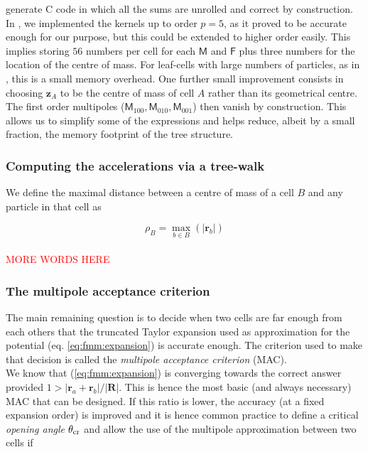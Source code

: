 generate C code in which all the sums are unrolled and correct by
construction. In \swift, we implemented the kernels up to order $p=5$,
as it proved to be accurate enough for our purpose, but this could be
extended to higher order easily. This implies storing $56$ numbers per
cell for each $\textsf{M}$ and $\textsf{F}$ plus three numbers for the
location of the centre of mass. For leaf-cells with large numbers of
particles, as in \swift, this is a small memory overhead. One further
small improvement consists in choosing $\mathbf{z}_A$ to be the centre
of mass of cell $A$ rather than its geometrical centre. The first
order multipoles
($\mathsf{M}_{100},\mathsf{M}_{010},\mathsf{M}_{001}$) then vanish by
construction. This allows us to simplify some of the expressions and
helps reduce, albeit by a small fraction, the memory footprint of the
tree structure.

\subsubsection{Computing the accelerations via a tree-walk}

We define the maximal distance between a centre of mass of a cell $B$ and
any particle in that cell as

\begin{equation}
  \rho_B = \max_{b \in B}(|\mathbf{r}_b|)
\end{equation}
\\
\textcolor{red}{MORE WORDS HERE}

\subsubsection{The multipole acceptance criterion}

The main remaining question is to decide when two cells are far enough from
each others that the truncated Taylor expansion used as approximation for
the potential (eq. \ref{eq:fmm:expansion}) is accurate enough. The
criterion used to make that decision is called the \emph{multipole
  acceptance criterion} (MAC). \\
We know that (\ref{eq:fmm:expansion}) is converging towards the correct
answer provided $1>|\mathbf{r}_a + \mathbf{r}_b| / |\mathbf{R}|$. This is
hence the most basic (and always necessary) MAC that can be designed. If
this ratio is lower, the accuracy (at a fixed expansion order) is improved
and it is hence common practice to define a critical \emph{opening angle}
$\theta_{\rm cr}$ and allow the use of the multipole approximation between
two cells if


